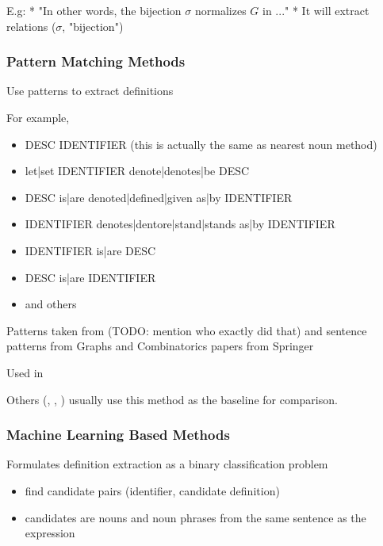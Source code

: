 E.g:
* "In other words, the bijection $\sigma$ normalizes $G$ in ..."
* It will extract relations ($\sigma$, "bijection")



\subsubsection{Pattern Matching Methods}

Use patterns to extract definitions

For example,

\begin{itemize}
  \item DESC IDENTIFIER (this is actually the same as nearest noun method)
  \item let|set IDENTIFIER denote|denotes|be DESC
  \item DESC is|are denoted|defined|given as|by IDENTIFIER
  \item IDENTIFIER denotes|dentore|stand|stands as|by IDENTIFIER
  \item IDENTIFIER is|are DESC
  \item DESC is|are IDENTIFIER
  \item and others
\end{itemize}


Patterns taken from
\cite{trzeciak1995writing} (TODO: mention who exactly did that)
and sentence patterns from Graphs and Combinatorics papers from Springer

Used in \cite{quoc2010mining}

Others (\cite{kristianto2012extracting}, \cite{kristianto2014extracting}, \cite{pagael2014mlp})
usually use this method as the baseline for comparison.


\subsubsection{Machine Learning Based Methods}
Formulates definition extraction as a binary classification problem

\begin{itemize}
  \item find candidate pairs (identifier, candidate definition)
  \item candidates are nouns and noun phrases from the same sentence as the expression
\end{itemize}


